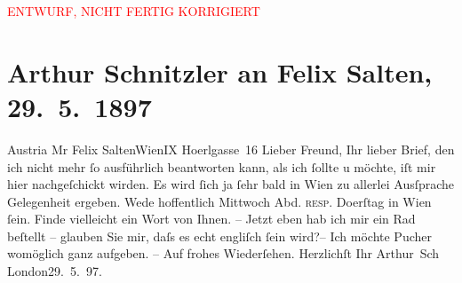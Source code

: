 
\begin{center}
            \textcolor{red}{ENTWURF, NICHT FERTIG KORRIGIERT}
                      \end{center}
            
         
         \renewcommand{\erwaehntePersonen}{Personen: Felix Salten}
         \renewcommand{\erwaehnteOrte}{Orte: Café Pucher, Hörlgasse, London, Wien}
         \renewcommand{\erwaehnteWerke}{}
               \section[Arthur Schnitzler an Felix Salten, 29. 5. 1897]{ Arthur Schnitzler an Felix Salten, 29. 5. 1897}\nopagebreak{}\rehead{ }\begin{ledgroupsized}[t]{13cm}\normalsize\beginnumbering \toendnotes[C]{\smallbreak\pagebreak[2]} 
\pstart{}{\pb}Austria \pend{}\pstart{}Mr Felix Salten\pend{}\pstart{}Wien\pend{}\pstart{}IX Hoerlgasse 16\pend{}{\bigskip}\pstart
           \noindent{}{\pb}Lieber Freund, Ihr lieber Brief, den ich nicht mehr ſo ausführlich
               beantworten kann, als ich ſollte u möchte, iſt mir hier nachgeſchickt wirden. Es wird
               ſich ja ſehr bald in Wien zu allerlei Ausſprache
               Gelegenheit \introOben{}er\introOben{}geben. Wede hoffentlich Mittwoch Abd. \textsc{resp.} Do{\geminationn}erſtag in Wien ſein. Finde vielleicht ein Wort von Ihnen. – Jetzt eben hab
               ich mir ein Rad beſtellt – glauben Sie mir, daſs es echt engliſch ſein wird?– Ich
               möchte Pucher womöglich ganz aufgeben. – Auf frohes
               Wiederſehen. Herzlichſt Ihr \pend
           \pstart \spacefill\mbox{Arthur Sch}\pend{}\pstart
           \raggedleft{}London29. 5. 97.\pend
           
         
         \endnumbering{}\end{ledgroupsized}\begin{anhang}\end{anhang}\newcommand{\dateiname}{L02964}\newcommand{\titel}{Arthur Schnitzler an Felix Salten, 29. 5. 1897}\newcommand{\editorInnen}{Martin Anton Müller und Laura Untner}
      
